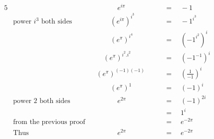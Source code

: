 \begin{alignat*}{5}
&\,&&\qquad\quad e^{i\pi}\quad&&\,=\quad-1\\
&\text{power }i^3\text{ both sides}&&\qquad\left(e^{i\pi}\right)^{i^3}\quad&&\,=\quad-1^{i^3}\\
&\,&&\qquad\left(e^\pi\right)^{i^4}\quad&&\,=\quad\left(-1^{i^2}\right)^i\\
&\,&&\quad\left(e^\pi\right)^{i^2.i^2}\quad&&\,=\quad\left(-1^{-1}\right)^i\\
&\,&&\left(e^\pi\right)^{(-1)(-1)}\quad&&\,=\quad\left(\frac{1}{-1}\right)^i\\
&\,&&\qquad\left(e^\pi\right)^1\quad&&\,=\quad(-1)^i\\
&\text{power }2\text{ both sides}&&\qquad\quad e^{2\pi}\quad&&\,=\quad(-1)^{2i}\\
&\,&&\,&&\,=\quad1^i\\
&\text{from the previous proof}&&\,&&\,=\quad e^{-2\pi}\\
&\text{Thus}&&\qquad\quad e^{2\pi}&&\,=\quad e^{-2\pi}
\end{alignat*}
